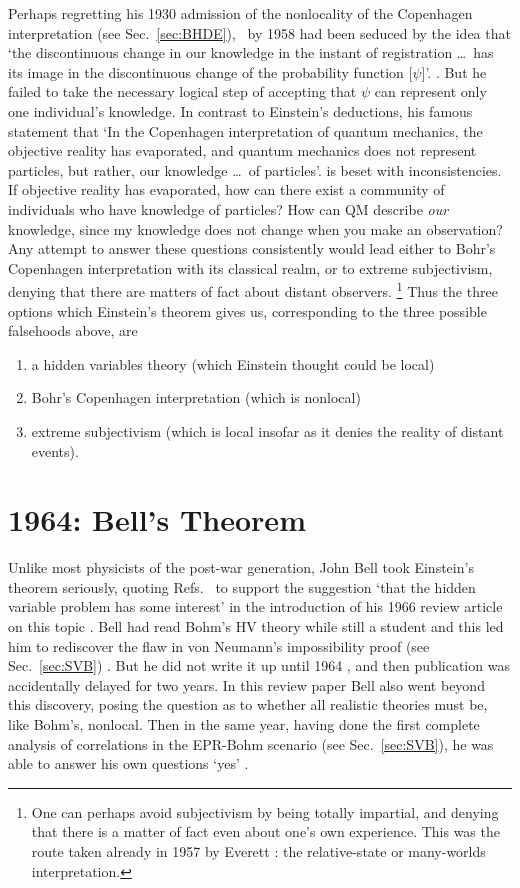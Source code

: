\documentclass[12pt]{iopart}
\begin{document}
Perhaps regretting his 1930 admission of the nonlocality of the Copenhagen interpretation 
(see Sec.~\ref{sec:BHDE}), \hei\ by 1958 had been seduced by the idea that `the discontinuous change in our knowledge in the instant of registration \ldots\ has its image in the discontinuous change of the probability function [$\psi$]'. \cite{Hei58}.  But he failed to take the necessary logical step of accepting that $\psi$ can represent only one individual's knowledge. In contrast to Einstein's deductions, his famous statement \cite{Hei58b} that `In the Copenhagen interpretation of quantum mechanics, the objective reality has evaporated, and quantum mechanics does not represent particles, but rather, our knowledge \ldots\ of particles'. is beset with inconsistencies. If objective reality has evaporated, how can there exist a community of individuals who have knowledge of particles? How can QM describe {\em our} knowledge, since my knowledge does not change when you make an observation? Any  attempt to answer these questions consistently would lead either to Bohr's Copenhagen interpretation with its classical realm, or to extreme subjectivism, denying that there are  matters of fact about distant observers. \footnote{One can perhaps avoid subjectivism by being totally impartial, and denying that there is a matter of fact even about one's own experience. This was the route taken already in 1957 by Everett \cite{Eve57}: the relative-state or many-worlds interpretation.}
Thus the three options which Einstein's theorem gives us, corresponding to the three possible falsehoods above, are 
\begin{enumerate}
\item a hidden variables theory (which Einstein thought could be local)
\item Bohr's Copenhagen interpretation (which is nonlocal)
\item extreme subjectivism (which is local insofar as it denies the reality of distant events).
\end{enumerate} 

\section{1964: Bell's Theorem} \label{sec:Bell}

Unlike most physicists of the post-war generation, John Bell took Einstein's theorem seriously, 
quoting Refs.~\cite{Ein46,Ein49} to support the suggestion `that the hidden variable problem has some interest' in the introduction of his 1966 review article on this topic \cite{Bel66}. Bell had read Bohm's HV theory while still a student and this led him to rediscover the flaw in von Neumann's impossibility proof (see Sec.~\ref{sec:SVB}) \cite{Wic95}. But he did not write it up until 1964 \cite{Bel66}, and then publication was accidentally delayed for two years. In this review paper Bell also went beyond this discovery, posing the question as to whether all realistic theories must be, like Bohm's, nonlocal.
Then in the same year, having done the first 
complete analysis of correlations in the EPR-Bohm scenario (see Sec.~\ref{sec:SVB}), 
 he was able to answer his own questions `yes' \cite{Bel64}.
 
\end{document}
